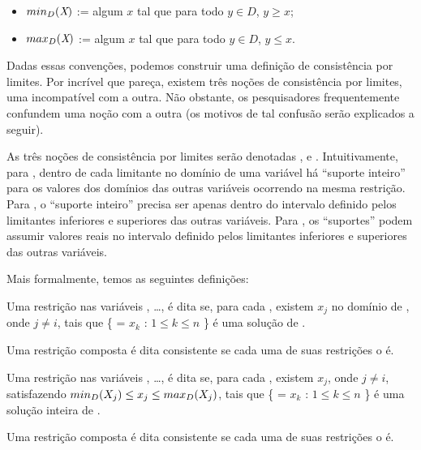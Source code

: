 \begin{itemize}
  \item $min_D(\textit{X})$ := algum $x$ tal que para todo $y \in D$, $y \geq x$;
  \item $max_D(\textit{X})$ := algum $x$ tal que para todo $y \in D$, $y  \leq x$.
\end{itemize}

Dadas essas convenções, podemos construir uma definição de consistência por limites. Por incrível
que pareça, existem três noções de consistência por limites, uma incompatível com a outra. Não
obstante, os pesquisadores frequentemente confundem uma noção com a outra (os motivos de tal
confusão serão explicados a seguir).

As três noções de consistência por limites serão denotadas \boundd, \boundz{} e \boundr.
Intuitivamente, para \boundd, dentro de cada limitante no domínio de uma variável há ``suporte
inteiro'' para os valores dos domínios das outras variáveis ocorrendo na mesma restrição.
Para \boundz, o ``suporte inteiro'' precisa ser apenas dentro do intervalo definido pelos limitantes
inferiores e superiores das outras variáveis.
Para \boundr, os ``suportes'' podem assumir valores reais no intervalo definido pelos limitantes
inferiores e superiores das outras variáveis.

Mais formalmente, temos as seguintes definições:

\begin{definition}
  Uma restrição  nas variáveis , \dots,  é dita
  se, para cada , existem  $x_j$ no domínio de , onde $j \neq i$, tais que \{ = $x_k$ : $1 \leq k \leq n$ \}
  é uma solução de .


  Uma restrição composta é dita \boundd{} consistente se cada uma de suas restrições o é.
\end{definition}

\begin{definition}
  Uma restrição  nas variáveis , \dots,  é dita
  se, para cada , existem  $x_j$, onde $j \neq i$,
  satisfazendo $min_D(\textit{$X_j$}) \leq x_j \leq max_D(\textit{$X_j$})$,
  tais que \{ = $x_k$ : $1 \leq k \leq n$ \}
  é uma solução inteira de .

  Uma restrição composta é dita \boundz{} consistente se cada uma de suas restrições o é.
\end{definition}


